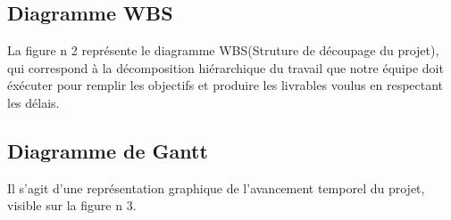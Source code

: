 \documentclass[11pt]{article}
\begin{document}
\subsection{Diagramme WBS}

La figure n 2 représente le diagramme WBS(Struture de découpage du projet), qui correspond à la décomposition hiérarchique du travail que notre équipe doit éxécuter pour remplir les objectifs et produire les livrables voulus en respectant les délais.
	

\subsection{Diagramme de Gantt}
Il s'agit d'une représentation graphique de l'avancement temporel du projet, visible sur la figure n 3.
\end{document}
